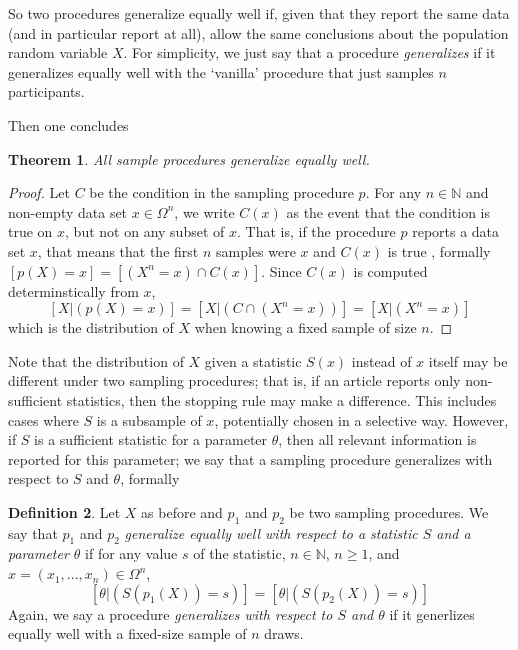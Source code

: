 \documentclass[man]{apa7}
\newtheorem{thm}{Theorem}
\theoremstyle{definition}
\newtheorem{defn}[thm]{Definition}
\newcommand{\N} {\mathbb{N}}
\begin{document}
So two procedures generalize equally well if, given that they report the same data (and in particular report at all), allow the same conclusions about the population random variable $X$. For simplicity, we just say that a procedure \emph{generalizes} if it generalizes equally well with the `vanilla' procedure that just samples $n$ participants.

Then one concludes
\begin{thm} \label{thm:AllSampleProceduresGeneralize}
All sample procedures generalize equally well.
\end{thm}
\begin{proof}
Let $C$ be the condition in the sampling procedure $p$. For any $n \in \N$ and non-empty data set $x \in \Omega^n$, we write $C(x)$ as the event that the condition is true on $x$, but not on any subset of $x$. That is, if the procedure $p$ reports a data set $x$, that means that the first $n$ samples were $x$ and $C(x)$ is true %
, formally $\left[p(X) = x\right] = \left[(X^n = x) \cap C(x) \right]$. Since $C(x)$ is computed determinstically from $x$,
\begin{equation}\left[X|(p(X) = x) \right] = \left[X|(C \cap (X^n = x)) \right] = \left[X|(X^n = x)\right] \end{equation}
which is the distribution of $X$ when knowing a fixed sample of size $n$.
\end{proof}

Note that the distribution of $X$ given a statistic $S(x)$ instead of $x$ itself may be different under two sampling procedures; that is, if an article reports only non-sufficient statistics, then the stopping rule may make a difference. This includes cases where $S$ is a subsample of $x$, potentially chosen in a selective way. However, if $S$ is a sufficient statistic for a parameter $\theta$, then all relevant information is reported for this parameter; we say that a sampling procedure generalizes with respect to $S$ and $\theta$, formally

\begin{defn}
\label{defn:sufficient}
Let $X$ as before and $p_1$ and $p_2$ be two sampling procedures. We say that $p_1$ and $p_2$ \emph{generalize equally well with respect to a statistic $S$ and a parameter $\theta$} if for any value $s$ of the statistic, $n \in \N$, $n \geq 1$, and $x = (x_1,...,x_n) \in \Omega^n$,
\begin{equation} \left[\theta|(S(p_1(X)) = s)\right] = \left[\theta|(S(p_2(X)) = s)\right] \end{equation}
Again, we say a procedure \emph{generalizes with respect to $S$ and $\theta$} if it generlizes equally well with a fixed-size sample of $n$ draws.
\end{defn}
\end{document}

